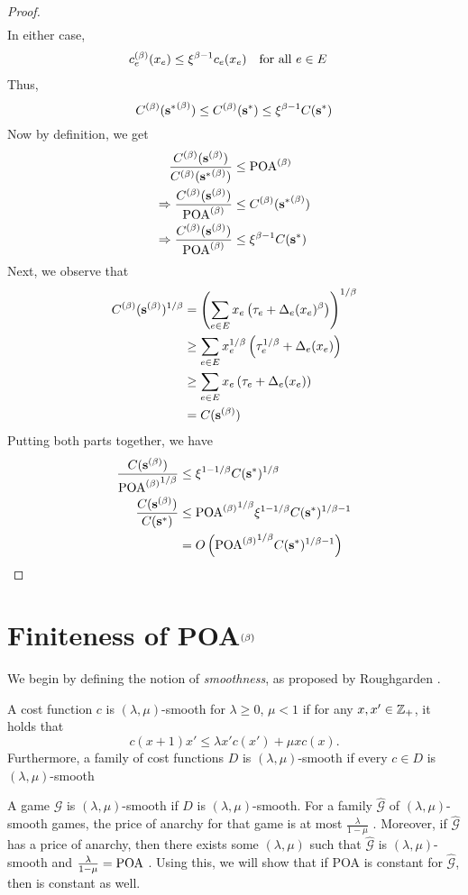 \documentclass[twoside]{article}
\begin{document}
\begin{multicols}{2}
\begin{proof}
\begin{align*}
  \end{align*}
  In either case,
  \begin{align*}
    c_e^{(\beta)}(x_e) &\le \xi^{\beta-1} c_e(x_e) \quad \text{for all }e \in E
  \end{align*}
  Thus,
  \[
    C^{(\beta)}({\mathbf{s}^*}^{(\beta)}) \le C^{(\beta)}(\mathbf{s}^*) \le \xi^{\beta-1} C(\mathbf{s}^*)
  \]
  Now by definition, we get 
  \begin{align*}
  \frac{C^{(\beta)}(\mathbf{s}^{(\beta)})}{C^{(\beta)}({\mathbf{s}^*}^{(\beta)})} &\le \text{POA}^{(\beta)} \\
  \Rightarrow \frac{C^{(\beta)}(\mathbf{s}^{(\beta)})}{\text{POA}^{(\beta)}} &\le C^{(\beta)}({\mathbf{s}^*}^{(\beta)}) \\
  \Rightarrow \frac{C^{(\beta)}(\mathbf{s}^{(\beta)})}{\text{POA}^{(\beta)}} &\le \xi^{\beta-1} C(\mathbf{s}^*)
  \end{align*}
  Next, we observe that
  \begin{align*}
    C^{(\beta)}(\mathbf{s}^{(\beta)})^{1/\beta} &= \left(\sum_{e \in E} x_e\left(\tau_e +
    \Delta_e(x_e)^\beta\right)\right)^{1/\beta} \\
    &\ge \sum_{e \in E} x_e^{1/\beta}\left(\tau_e^{1/\beta} + \Delta_e(x_e)\right) \\
    &\ge \sum_{e \in E} x_e\left(\tau_e + \Delta_e(x_e)\right) \\
    &= C(\mathbf{s}^{(\beta)})
  \end{align*}
  Putting both parts together, we have
  \begin{align*}
    \frac{C(\mathbf{s}^{(\beta)})}{{\text{POA}^{(\beta)}}^{1/\beta}} &\le \xi^{1-1/\beta} C(\mathbf{s}^*)^{1/\beta} \\
    \frac{C(\mathbf{s}^{(\beta)})}{C(\mathbf{s}^*)} &\le {\ensuremath{\text{POA}^{(\beta)}}}^{1/\beta} \xi^{1-1/\beta}
    C(\mathbf{s}^*)^{1/\beta-1} \\
    &= O\left({\text{POA}^{(\beta)}}^{1/\beta} C(\mathbf{s}^*)^{1/\beta-1}\right)
  \end{align*}
\end{proof}


\section{Finiteness of POA$^{(\beta)}$} \label{sec:ubl}
We begin by defining the notion of \textit{smoothness}, as proposed by
Roughgarden \cite{Roughgarden2012}.
\begin{defn}
  A cost function $c$ is $(\lambda,\mu)$-smooth for $\lambda \ge 0$, $\mu < 1$
  if for any $x,x' \in \mathbb{Z}_+$, it holds that
  \begin{equation}
    c(x+1) x' \le \lambda x' c(x') + \mu x c(x).
    \label{eq:lms1}
  \end{equation}
  Furthermore, a family of cost functions $D$ is $(\lambda,\mu)$-smooth if every
  $c \in D$ is $(\lambda,\mu)$-smooth
\end{defn}A game $\mathcal{G}$ is $(\lambda,\mu)$-smooth if $D$ is $(\lambda,\mu)$-smooth.
For a family $\hat{\mathcal{G}}$ of $(\lambda,\mu)$-smooth games, the price of
anarchy for that game is at most $\frac{\lambda}{1-\mu}$ \cite{Roughgarden2012}.
Moreover, if $\hat{\mathcal{G}}$ has a price of anarchy, then there exists
some $(\lambda,\mu)$ such that $\hat{\mathcal{G}}$ is $(\lambda,\mu)$-smooth and
$\frac{\lambda}{1-\mu} = \text{POA}$ \cite{Roughgarden2012}. Using this, we will show
that if POA is constant for $\hat{\mathcal{G}}$, then \poab is constant as well.


\end{multicols}
\end{document}
